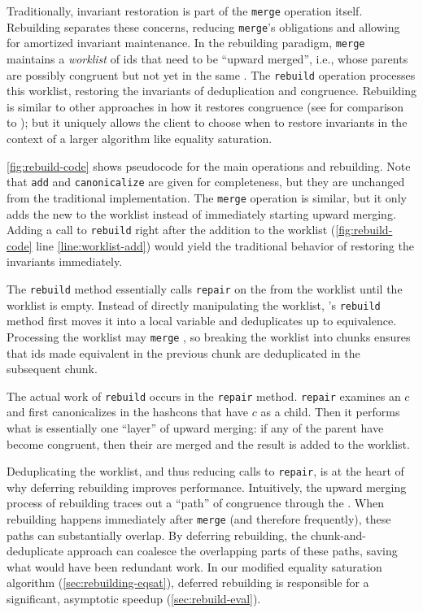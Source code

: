 Traditionally, invariant restoration is part of the
  \texttt{merge} operation itself.
Rebuilding separates these concerns,
  reducing \texttt{merge}'s obligations
  and allowing for amortized invariant maintenance.
In the rebuilding paradigm,
  \texttt{merge} maintains a \textit{worklist} of \eclass ids that need to
  be ``upward merged'', i.e., \eclasses whose parents are possibly congruent but
  not yet in the same \eclass.
The \texttt{rebuild} operation processes this worklist, restoring the invariants
  of deduplication and congruence.
Rebuilding is similar to other approaches in how it restores congruence
  (see  for comparison to \citet{downey-cse});
  but it uniquely allows the client to choose when to restore invariants in the
  context of a larger algorithm like equality saturation.

\autoref{fig:rebuild-code} shows pseudocode for the main \egraph operations and
  rebuilding.
Note that \texttt{add} and \texttt{canonicalize} are given for completeness, but
  they are unchanged from the traditional \egraph implementation.
The \texttt{merge} operation is similar, but it only adds the new \eclass to the
  worklist instead of immediately starting upward merging.
Adding a call to \texttt{rebuild} right after the addition to
  the worklist (\autoref{fig:rebuild-code} line \ref{line:worklist-add})
  would yield the traditional behavior of restoring the invariants immediately.

The \texttt{rebuild} method essentially calls \texttt{repair} on the \eclasses
  from the worklist until the worklist is empty.
Instead of directly manipulating the worklist, \egg's \texttt{rebuild} method
  first moves it into a local variable and deduplicates \eclasses
  up to equivalence.
Processing the worklist may \texttt{merge} \eclasses,
  so breaking the worklist into chunks ensures that \eclass ids made
  equivalent in the previous chunk are deduplicated in the subsequent chunk.

The actual work of \texttt{rebuild} occurs in the \texttt{repair} method.
\texttt{repair} examines an \eclass $c$ and first canonicalizes \enodes in the
  hashcons that have $c$ as a child.
Then it performs what is essentially one ``layer'' of upward
  merging:
if any of the parent \enodes have become congruent, then their
  \eclasses are merged and the result is added to the worklist.

Deduplicating the worklist, and thus reducing calls to \texttt{repair},
  is at the heart of why deferring rebuilding improves
  performance.
Intuitively, the upward merging process of rebuilding traces out a ``path'' of
  congruence through the \egraph.
When rebuilding happens immediately after \texttt{merge}
  (and therefore frequently), these paths can substantially overlap.
By deferring rebuilding, the chunk-and-deduplicate approach can coalesce the
overlapping parts of these paths, saving what would have been redundant work.
In our modified equality saturation algorithm (\autoref{sec:rebuilding-eqsat}),
  deferred rebuilding is responsible for a significant, asymptotic speedup
  (\autoref{sec:rebuild-eval}).

